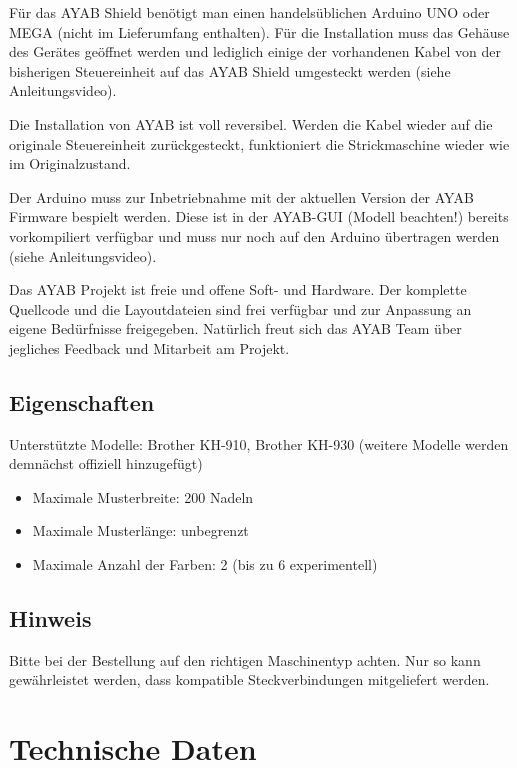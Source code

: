 \documentclass[fleqn,10pt]{SelfArx} %
\begin{document}
Für das AYAB Shield benötigt man einen handelsüblichen Arduino UNO oder MEGA (nicht im Lieferumfang enthalten). Für die Installation muss das Gehäuse des Gerätes geöffnet werden und lediglich einige der vorhandenen Kabel von der bisherigen Steuereinheit auf das AYAB Shield umgesteckt werden (siehe Anleitungsvideo).

Die Installation von AYAB ist voll reversibel. Werden die Kabel wieder auf die originale Steuereinheit zurückgesteckt, funktioniert die Strickmaschine wieder wie im Originalzustand.

Der Arduino muss zur Inbetriebnahme mit der aktuellen Version der AYAB Firmware bespielt werden. Diese ist in der AYAB-GUI (Modell beachten!) bereits vorkompiliert verfügbar und muss nur noch auf den Arduino übertragen werden (siehe Anleitungsvideo).

Das AYAB Projekt ist freie und offene Soft- und Hardware. Der komplette Quellcode und die Layoutdateien sind frei verfügbar und zur Anpassung an eigene Bedürfnisse freigegeben. Natürlich freut sich das AYAB Team über jegliches Feedback und Mitarbeit am Projekt.

 \subsection*{Eigenschaften}

Unterstützte Modelle: Brother KH-910, Brother KH-930 (weitere Modelle werden demnächst offiziell hinzugefügt)
\begin{itemize}[noitemsep] %
\item Maximale Musterbreite: 200 Nadeln
\item Maximale Musterlänge: unbegrenzt
\item Maximale Anzahl der Farben: 2 (bis zu 6 experimentell)
\end{itemize}

 \subsection*{Hinweis}

Bitte bei der Bestellung auf den richtigen Maschinentyp achten. Nur so kann gewährleistet werden, dass kompatible Steckverbindungen mitgeliefert werden.


\section{Technische Daten}
\end{document}
